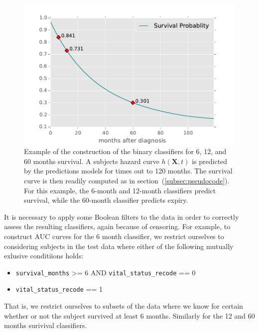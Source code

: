 \documentclass[a4paper,11pt]{article}
\newcommand{\codewhite}[1]{\colorbox{white}{\texttt{#1}}}
\begin{document}
\begin{figure}[tbp]
\centering 
\begin{center}
\includegraphics[width=.90\textwidth,origin=c]{survivalexample.pdf}
\caption{\label{fig:survivalexample} Example of the construction of the binary classifiers for 6, 12, and 60 months survival.
A subjects hazard curve $h(\mathbf{X}, t)$ is predicted by the predictions models for times out to 120 months. The survival curve is then readily computed as in section~(\ref{subsec:pseudocode}). For this example, the 6-month and 12-month classifiers predict survival, while the 60-month classifier predicts expiry.}
\end{center}
\end{figure}



It is necessary to apply some Boolean filters to the data in order to correctly assess the resulting classifiers, again because of censoring. For example, to construct AUC curves for the 6 month classifier, we restrict ourselves to considering
subjects in the test data where either of the following mutually exlusive conditiions holds:

\begin{itemize}[noitemsep]
\item \codewhite{survival\_months} >= 6 AND \codewhite{vital\_status\_recode} == 0
\item \codewhite{vital\_status\_recode} == 1
\end{itemize}

That is, we restrict ourselves to subsets of the data where we know for certain whether or not the subject survived at least 6 months. Similarly for the 12 and 60 months surivival classifiers. 
\end{document}

